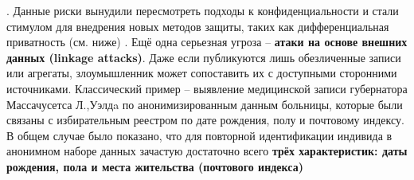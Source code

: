 \autocite{blog-seas-upenn-edu}
. Данные риски вынудили пересмотреть подходы к конфиденциальности и стали стимулом для внедрения новых методов защиты, таких как дифференциальная приватность (см. ниже)
\autocite{blog-seas-upenn-edu}
. Ещё одна серьезная угроза – \textbf{атаки на основе внешних данных (linkage attacks)}. Даже если публикуются лишь обезличенные записи или агрегаты, злоумышленник может сопоставить их с доступными сторонними источниками. Классический пример – выявление медицинской записи губернатора Массачусетса Л.,Уэлдa по анонимизированным данным больницы, которые были связаны с избирательным реестром по дате рождения, полу и почтовому индексу. В общем случае было показано, что для повторной идентификации индивида в анонимном наборе данных зачастую достаточно всего \textbf{трёх характеристик: даты рождения, пола и места жительства (почтового индекса)}

